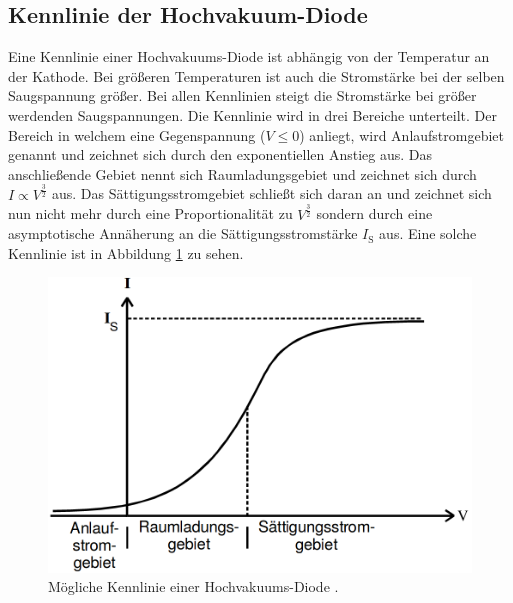 \subsection{Kennlinie der Hochvakuum-Diode}
Eine Kennlinie einer Hochvakuums-Diode ist abhängig von der Temperatur an der Kathode. Bei größeren Temperaturen ist auch die Stromstärke bei der selben Saugspannung größer. Bei allen Kennlinien steigt die Stromstärke bei größer werdenden Saugspannungen. Die Kennlinie wird in drei Bereiche unterteilt. Der Bereich in welchem eine Gegenspannung ($V\le0$) anliegt, wird Anlaufstromgebiet genannt und zeichnet sich durch den exponentiellen Anstieg aus. Das anschließende Gebiet nennt sich Raumladungsgebiet und zeichnet sich durch $I \propto V^\frac{3}{2}$ aus. Das Sättigungsstromgebiet schließt sich daran an und zeichnet sich nun nicht mehr durch eine Proportionalität zu $V^\frac{3}{2}$ sondern durch eine asymptotische Annäherung an die Sättigungsstromstärke $I_\text{S}$ aus. Eine solche Kennlinie ist in Abbildung \ref{fig:Kennlinie} zu sehen.
\begin{figure}
	\centering
	\includegraphics[width=\linewidth-100pt,height=\textheight-100pt,keepaspectratio]{content/Bilder/Kennlinie.png}
	\caption{Mögliche Kennlinie einer Hochvakuums-Diode \cite{V504}.}
	\label{fig:Kennlinie}
\end{figure}

